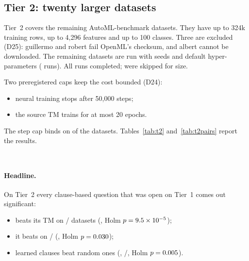 \subsection{Tier 2: twenty larger datasets}\label{sec:tier2}
Tier~2 covers the remaining AutoML-benchmark datasets. They have up to 324k training rows,
up to 4{,}296 features and up to 100 classes. Three are excluded (D25): guillermo and robert
fail OpenML's checksum, and albert cannot be downloaded. The remaining \TiertwoDatasets{}
datasets are run with \TiertwoSeeds{} seeds and default hyper-parameters (\TiertwoRecords{}
runs). All runs completed; \TiertwoSkipped{} were skipped for size.

Two preregistered caps keep the cost bounded (D24):
\begin{itemize}
  \item neural training stops after 50{,}000 steps;
  \item the source TM trains for at most 20 epochs.
\end{itemize}
The step cap binds on \TiertwoCappedN{} of the \TiertwoDatasets{} datasets.
Tables~\ref{tab:t2} and~\ref{tab:t2pairs} report the results.

\begin{table}[t]
  \centering
  \caption{Tier 2: test AUROC (mean{\tiny$\pm$sd} over \TiertwoSeeds{} seeds), default
  hyper-parameters with the step cap. Layout as in Table~\ref{tab:main}.}
  \label{tab:t2}
  \small
  \resizebox{\textwidth}{!}{}\\[4pt]
  \resizebox{\textwidth}{!}{}
\end{table}
\begin{table}[t]
  \centering\small
  \caption{Preregistered comparisons on Tier 2 (\TiertwoDatasets{} datasets).
  $^\ast$: Holm-corrected $p<0.05$.}
  \label{tab:t2pairs}
  
\end{table}

\paragraph{Headline.} On Tier~2 every clause-based question that was open on Tier~1 comes out
significant:
\begin{itemize}
  \item {} beats its TM on \TiertwoimntmtmWins/\TiertwoDatasets{} datasets
        (\TiertwoimntmtmMean, Holm $p=9.5\times 10^{-5}$);
  \item it beats \imn{} on \TiertwoimntmimnWins/\TiertwoDatasets{} (\TiertwoimntmimnMean,
        Holm $p=0.030$);
  \item learned clauses beat random ones (\TiertwoimntmimntmrandMean,
        \TiertwoimntmimntmrandWins/\TiertwoimntmimntmrandLosses, Holm
        $p=0.005$).
\end{itemize}

